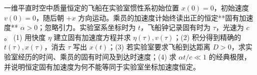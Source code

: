 一维平直时空中质量恒定的飞船在实验室惯性系初始位置 \(x(0)=0\)，初始速度 \(v(0)=0\)，随后朝 \(+x\) 方向运动。乘员的加速度计始终读出正的恒定**固有加速度** \(\alpha>0\)；忽略引力。实验室系坐标时为 \(t\)，飞船钟记录固有时为 \(\tau\)，光速为 \(c\)。
(1) 用快度 \(\eta\) 建立固有加速度方程并求 \(\eta(\tau),v(\tau)\)；(2) 积分得到精确的 \(t(\tau),x(\tau)\)，消去 \(\tau\) 写出 \(x(t)\)；(3) 若实验室要求飞船到达距离 \(D>0\)，求实验室经历的时间、乘员的固有时间及到达时速度；(4) 求 \(\alpha t/c\ll1\) 的经典极限，并说明恒定固有加速度为何不能等同于实验室坐标加速度恒定。
